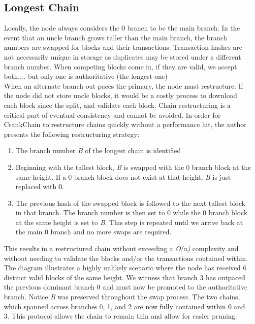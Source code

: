 \documentclass[10pt,twocolumn]{article}
\begin{document}
\subsection{Longest Chain}
Locally, the node always considers the 0 branch to be the main branch.  In the event that an uncle branch grows taller than the main branch, the branch numbers are swapped for blocks and their transactions.  Transaction hashes are not necessarily unique in storage as duplicates may be stored under a different branch number. When competing blocks come in, if they are valid, we accept both.... but only one is authoritative (the longest one)\\
When an alternate branch out paces the primary, the node must restructure.  If the node did not store uncle blocks, it would be a costly process to download each block since the split, and validate each block.  Chain restructuring is a critical part of eventual consistency and cannot be avoided.  In order for CrankChain to restructure chains quickly without a performance hit, the author presents the following restructuring strategy:
\begin{enumerate}[noitemsep]
\item The branch number \textit{B} of the longest chain is identified
\item Beginning with the tallest block, \textit{B} is swapped with the 0 branch block at the same height.  If a 0 branch block does not exist at that height, \textit{B} is just replaced with 0.
\item The previous hash of the swapped block is followed to the next tallest block in that branch.  The branch number is then set to 0 while the 0 branch block at the same height is set to \textit{B}.  This step is repeated until we arrive back at the main 0 branch and no more swaps are required.
\end{enumerate}
This results in a restructured chain without exceeding a \textit{O(n)} complexity and without needing to validate the blocks and/or the transactions contained within.  The diagram illustrates a highly unlikely scenario where the node has received 6 distinct valid blocks of the same height.  We witness that branch 3 has outpaced the previous dominant branch 0 and must now be promoted to the authoritative branch.  Notice \textit{B} was preserved throughout the swap process.  The two chains, which spanned across branches 0, 1, and 2 are now fully contained within 0 and 3.  This protocol allows the chain to remain thin and allow for easier pruning.
\end{document}
